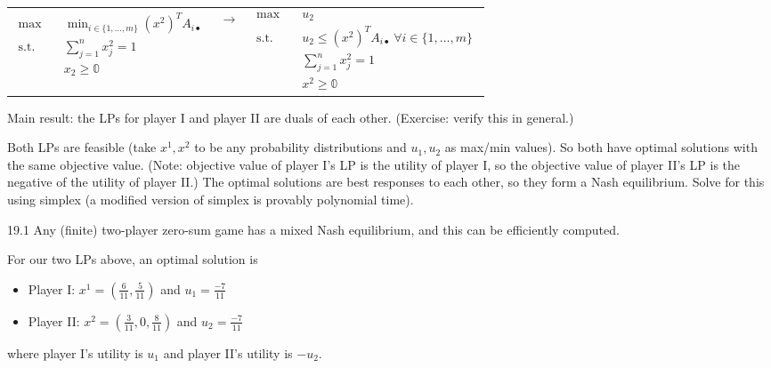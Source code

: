 \documentclass[12pt,letterpaper]{report}
\begin{document}
\begin{center}
\begin{tabular}{c c c}
  $\begin{aligned}
    \max \quad & \min_{i \in \{1, \ldots, m\}} (x^2)^T A_{i \bullet} \\
    \text{s.t.} \quad & \sum_{j = 1}^n x_j^2 = 1 \\
    & x_2 \geq \mathbb{0} \\
  \end{aligned}$
  &
  $\longrightarrow$
  &
  $\begin{aligned}
    \max \quad & u_2 \\
    \text{s.t.} \quad & u_2 \leq (x^2)^T A_{i \bullet} \ \forall i \in \{1, \ldots, m\} \\
    & \sum_{j = 1}^n x_j^2 = 1 \\
    & x^2 \geq \mathbb{0}
  \end{aligned}$
  \\
\end{tabular}
\end{center}

Main result: the LPs for player I and player II are duals of each other.
(Exercise: verify this in general.)

Both LPs are feasible (take $x^1, x^2$ to be any probability distributions and $u_1, u_2$ as
max/min values).
So both have optimal solutions with the same objective value.
(Note: objective value of player I's LP is the utility of player I, so the objective value of
player II's LP is the negative of the utility of player II.)
The optimal solutions are best responses to each other, so they form a Nash equilibrium.
Solve for this using simplex (a modified version of simplex is provably polynomial time).

\begin{thm}{}{19.1}
  Any (finite) two-player zero-sum game has a mixed Nash equilibrium, and this can be efficiently
  computed.
\end{thm}

\begin{ex}
  For our two LPs above, an optimal solution is
  \begin{itemize}
    \item Player I: $x^1 = (\frac{6}{11}, \frac{5}{11})$ and $u_1 = \frac{-7}{11}$
    \item Player II: $x^2 = (\frac{3}{11}, 0, \frac{8}{11})$ and $u_2 = \frac{-7}{11}$
  \end{itemize}
  where player I's utility is $u_1$ and player II's utility is $-u_2$.
\end{ex}
\end{document}
